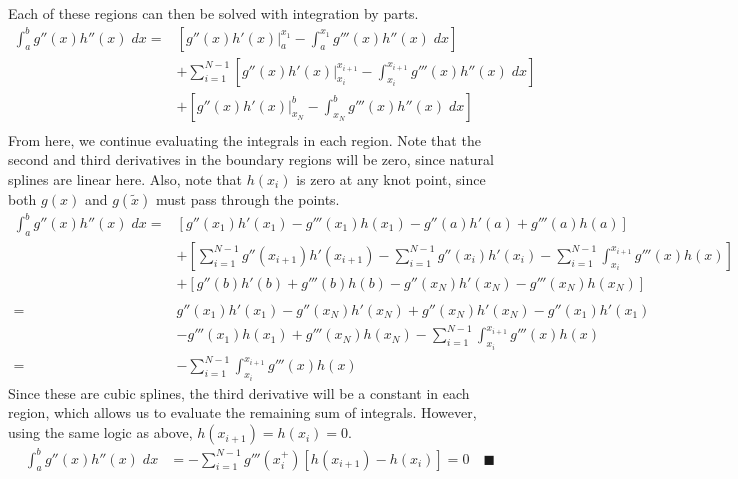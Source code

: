\documentclass[a4paper]{article}
\begin{document}
Each of these regions can then be solved with integration by parts.
\begin{align*}
  \int_a^b g''(x)h''(x)\;dx
    = &\left[g''(x)h'(x)\rvert_a^{x_1} - \int_a^{x_1}g'''(x)h''(x)\;dx\right]\\
    &+ \sum_{i=1}^{N-1}\left[g''(x)h'(x)\rvert_{x_i}^{x_{i+1}} -
                            \int_{x_i}^{x_{i+1}}g'''(x)h''(x)\;dx\right]\\
   &+ \left[g''(x)h'(x)\rvert_{x_N}^{b} - \int_{x_N}^{b}g'''(x)h''(x)\;dx\right]\\
\end{align*}
From here, we continue evaluating the integrals in each region.
Note that the second and third derivatives in the boundary regions will be zero, since
natural splines are linear here.  Also, note that $h(x_i)$ is zero at any knot
point, since both $g(x)$ and $g(\widetilde{x})$ must pass through the points.
\begin{align*}
  \int_a^b g''(x)h''(x)\;dx
    =& \left[g''(x_1)h'(x_1) - g'''(x_1)h(x_1) - g''(a)h'(a) + g'''(a)h(a)\right]\\
    &+ \left[\sum_{i=1}^{N-1}g''(x_{i+1})h'(x_{i+1}) -
             \sum_{i=1}^{N-1}g''(x_i)h'(x_i) -
             \sum_{i=1}^{N-1}\int_{x_{i}}^{x_{i+1}}g'''(x)h(x)\right]\\
    &+ \left[g''(b)h'(b) + g'''(b)h(b) - g''(x_N)h'(x_N) - g'''(x_N)h(x_N)\right]\\\\
    =& g''(x_1)h'(x_1) - g''(x_N)h'(x_N) + g''(x_N)h'(x_N) - g''(x_1)h'(x_1)\\
       & - g'''(x_1)h(x_1) + g'''(x_N)h(x_N)
      - \sum_{i=1}^{N-1}\int_{x_{i}}^{x_{i+1}}g'''(x)h(x)\\
    =& - \sum_{i=1}^{N-1}\int_{x_{i}}^{x_{i+1}}g'''(x)h(x)
\end{align*}
Since these are cubic splines, the third derivative will be a constant in each region,
which allows us to evaluate the remaining sum of integrals.  However, using the
same logic as above, $h(x_{i+1}) = h(x_i) = 0$.
\begin{align*}
  \int_a^b g''(x)h''(x)\;dx
  &= -\sum_{i=1}^{N-1}g'''(x_i^+)\left[h(x_{i+1}) - h(x_i)\right] = 0 \quad \blacksquare
\end{align*}
\end{document}
